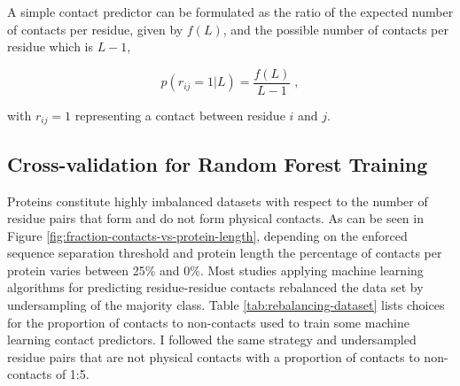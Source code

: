 \documentclass[11pt,a4paper,twoside]{book}
\theoremstyle{definition}
\theoremstyle{definition}
\theoremstyle{remark}
\begin{document}
A simple contact predictor can be formulated as the ratio of the
expected number of contacts per residue, given by \(f(L)\), and the
possible number of contacts per residue which is \(L-1\),

\[
p(r_{ij} = 1 | L) = \frac{f(L)}{L-1} \; ,
\]

with \(r_{ij}=1\) representing a contact between residue \(i\) and
\(j\).

\subsection{Cross-validation for Random Forest
Training}\label{rf-training}

Proteins constitute highly imbalanced datasets with respect to the
number of residue pairs that form and do not form physical contacts. As
can be seen in Figure \ref{fig:fraction-contacts-vs-protein-length},
depending on the enforced sequence separation threshold and protein
length the percentage of contacts per protein varies between 25\% and
0\%. Most studies applying machine learning algorithms for predicting
residue-residue contacts rebalanced the data set by undersampling of the
majority class. Table \ref{tab:rebalancing-dataset} lists choices for
the proportion of contacts to non-contacts used to train some machine
learning contact predictors. I followed the same strategy and
undersampled residue pairs that are not physical contacts with a
proportion of contacts to non-contacts of 1:5.
\end{document}

